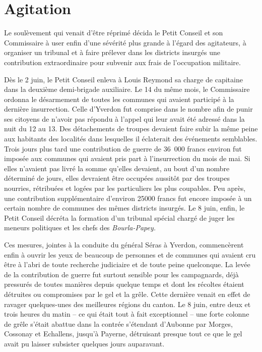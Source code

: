 \documentclass[french,twoside]{book} %
\begin{document}
\section[{Agitation}]{Agitation}
\noindent Le soulèvement qui venait d’être réprimé décida le Petit Conseil et son Commissaire à user enfin d’une sévérité plus grande à l’égard des agitateurs, à organiser un tribunal et à faire prélever dans les districts insurgés une contribution extraordinaire pour subvenir aux frais de l’occupation militaire.\par
Dès le 2 juin, le Petit Conseil enleva à Louis Reymond sa charge de capitaine dans la deuxième demi-brigade auxiliaire. Le 14 du même mois, le Commissaire ordonna le désarmement de toutes les communes qui avaient participé à la dernière insurrection. Celle d’Yverdon fut comprise dans le nombre afin de punir ses citoyens de n’avoir pas répondu à l’appel qui leur avait été adressé dans la nuit du 12 au 13. Des détachements de troupes devaient faire subir la même peine aux habitants des localités dans lesquelles il éclaterait des événements semblables. Trois jours plus tard une contribution de guerre de 36 000 francs environ fut imposée aux communes qui avaient pris part à l’insurrection du mois de mai. Si elles n’avaient pas livré la somme qu’elles devaient, au bout d’un nombre déterminé de jours, elles devraient être occupées aussitôt par des troupes nourries, rétribuées et logées par les particuliers les plus coupables. Peu après, une contribution supplémentaire d’environ 25000 francs fut encore imposée à un certain nombre de communes des mêmes districts insurgés. Le 8 juin, enfin, le Petit Conseil décréta la formation d’un tribunal spécial chargé de juger les meneurs politiques et les chefs des \emph{Bourla-Papey.}\par
Ces mesures, jointes à la conduite du général Séras à Yverdon, commencèrent enfin à ouvrir les yeux de beaucoup de personnes et de communes qui avaient cru être à l’abri de toute recherche judiciaire et de toute peine quelconque. La levée de la contribution de guerre fut surtout sensible pour les campagnards, déjà pressurés de toutes manières depuis quelque temps et dont les récoltes étaient détruites ou compromises par le gel et la grêle. Cette dernière venait en effet de ravager quelques-unes des meilleures régions du canton. Le 8 juin, entre deux et trois heures du matin – ce qui était tout à fait exceptionnel – une forte colonne de grêle s’était abattue dans la contrée s’étendant d’Aubonne par Morges, Cossonay et Echallens, jusqu’à Payerne, détruisant presque tout ce que le gel avait pu laisser subsister quelques jours auparavant.\par
\end{document}
